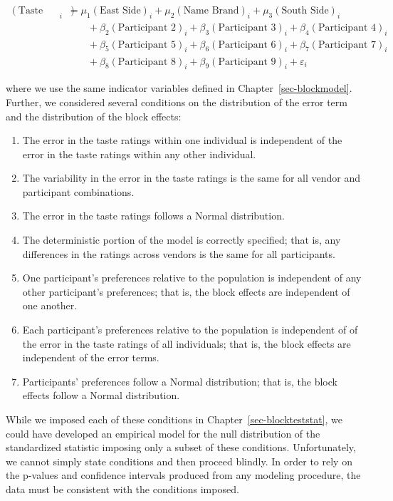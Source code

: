 \documentclass[
  letterpaper,
  DIV=11,
  numbers=noendperiod]{scrreprt}
\providecommand{\tightlist}{%
  \setlength{\itemsep}{0pt}\setlength{\parskip}{0pt}}\usepackage{longtable,booktabs,array}
\theoremstyle{definition}
\theoremstyle{definition}
\theoremstyle{plain}
\theoremstyle{remark}
\begin{document}
\[
\begin{aligned}
  (\text{Taste Rating})_i &= \mu_1 (\text{East Side})_i + \mu_2 (\text{Name Brand})_i + \mu_3 (\text{South Side})_i \\
    &\qquad + \beta_2 (\text{Participant 2})_i + \beta_3 (\text{Participant 3})_i + \beta_4 (\text{Participant 4})_i \\
    &\qquad + \beta_5 (\text{Participant 5})_i + \beta_6 (\text{Participant 6})_i + \beta_7 (\text{Participant 7})_i \\
    &\qquad + \beta_8 (\text{Participant 8})_i + \beta_9 (\text{Participant 9})_i + \varepsilon_i
\end{aligned}
\]

where we use the same indicator variables defined in
Chapter~\ref{sec-blockmodel}. Further, we considered several conditions
on the distribution of the error term and the distribution of the block
effects:

\begin{enumerate}
\def\labelenumi{\arabic{enumi}.}
\tightlist
\item
  The error in the taste ratings within one individual is independent of
  the error in the taste ratings within any other individual.
\item
  The variability in the error in the taste ratings is the same for all
  vendor and participant combinations.
\item
  The error in the taste ratings follows a Normal distribution.
\item
  The deterministic portion of the model is correctly specified; that
  is, any differences in the ratings across vendors is the same for all
  participants.
\item
  One participant's preferences relative to the population is
  independent of any other participant's preferences; that is, the block
  effects are independent of one another.
\item
  Each participant's preferences relative to the population is
  independent of of the error in the taste ratings of all individuals;
  that is, the block effects are independent of the error terms.
\item
  Participants' preferences follow a Normal distribution; that is, the
  block effects follow a Normal distribution.
\end{enumerate}

While we imposed each of these conditions in
Chapter~\ref{sec-blockteststat}, we could have developed an empirical
model for the null distribution of the standardized statistic imposing
only a subset of these conditions. Unfortunately, we cannot simply state
conditions and then proceed blindly. In order to rely on the p-values
and confidence intervals produced from any modeling procedure, the data
must be consistent with the conditions imposed.
\end{document}
